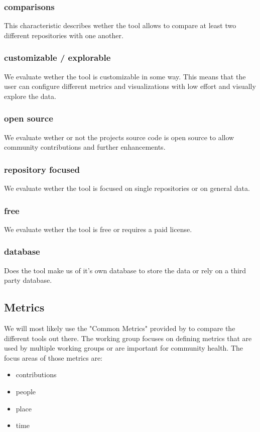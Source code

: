 \documentclass[authoryear,preprint,review,12pt]{elsarticle}
\begin{document}
\subsubsection{comparisons}
This characteristic describes wether the tool allows to compare at least two different repositories
with one another.

\subsubsection{customizable / explorable}
We evaluate wether the tool is customizable in some way. This means that the user can configure
different metrics and visualizations with low effort and visually explore the data.

\subsubsection{open source}
We evaluate wether or not the projects source code is open source to allow community contributions
and further enhancements.

\subsubsection{repository focused}
We evaluate wether the tool is focused on single repositories or on general data.

\subsubsection{free}
We evaluate wether the tool is free or requires a paid license.

\subsubsection{database}
Does the tool make us of it's own database to store the data or rely on a third party database.

\subsection{Metrics}
We will most likely use the "Common Metrics" provided by \citet{CHAOSSCommonMetrics2022} to compare
the different tools out there. The working group focuses on defining metrics that are used by
multiple working groups or are important for community health. The focus areas of those metrics
are:
\begin{itemize}
  \item contributions
  \item people
  \item place
  \item time
\end{itemize}
\end{document}
